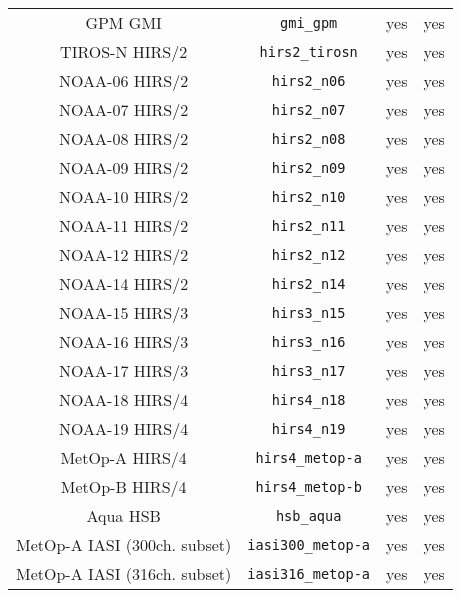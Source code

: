 \begin{center}
\begin{longtable}{c c c c}
  GPM GMI                            & \texttt{gmi\_gpm}            &  yes     &  yes       \\
  TIROS-N HIRS/2                     & \texttt{hirs2\_tirosn}       &  yes     &  yes       \\
  NOAA-06 HIRS/2                     & \texttt{hirs2\_n06}          &  yes     &  yes       \\
  NOAA-07 HIRS/2                     & \texttt{hirs2\_n07}          &  yes     &  yes       \\
  NOAA-08 HIRS/2                     & \texttt{hirs2\_n08}          &  yes     &  yes       \\
  NOAA-09 HIRS/2                     & \texttt{hirs2\_n09}          &  yes     &  yes       \\
  NOAA-10 HIRS/2                     & \texttt{hirs2\_n10}          &  yes     &  yes       \\
  NOAA-11 HIRS/2                     & \texttt{hirs2\_n11}          &  yes     &  yes       \\
  NOAA-12 HIRS/2                     & \texttt{hirs2\_n12}          &  yes     &  yes       \\
  NOAA-14 HIRS/2                     & \texttt{hirs2\_n14}          &  yes     &  yes       \\
  NOAA-15 HIRS/3                     & \texttt{hirs3\_n15}          &  yes     &  yes       \\
  NOAA-16 HIRS/3                     & \texttt{hirs3\_n16}          &  yes     &  yes       \\
  NOAA-17 HIRS/3                     & \texttt{hirs3\_n17}          &  yes     &  yes       \\
  NOAA-18 HIRS/4                     & \texttt{hirs4\_n18}          &  yes     &  yes       \\
  NOAA-19 HIRS/4                     & \texttt{hirs4\_n19}          &  yes     &  yes       \\
  MetOp-A HIRS/4                     & \texttt{hirs4\_metop-a}      &  yes     &  yes       \\
  MetOp-B HIRS/4                     & \texttt{hirs4\_metop-b}      &  yes     &  yes       \\
  Aqua HSB                           & \texttt{hsb\_aqua}           &  yes     &  yes       \\
  MetOp-A IASI (300ch. subset)       & \texttt{iasi300\_metop-a}    &  yes     &  yes       \\
  MetOp-A IASI (316ch. subset)       & \texttt{iasi316\_metop-a}    &  yes     &  yes       \\

\end{longtable}
\end{center}
